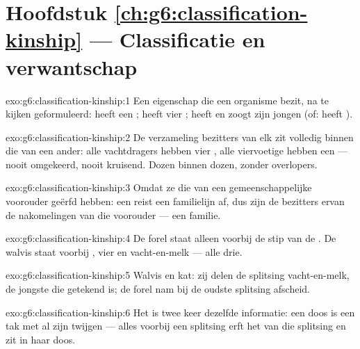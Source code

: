 \section*{Hoofdstuk \ref{ch:g6:classification-kinship} --- Classificatie en verwantschap}

\begin{solution}{exo:g6:classification-kinship:1}
Een eigenschap die een organisme bezit, na te kijken geformuleerd: heeft
een ; heeft vier ; heeft  en zoogt zijn jongen
(of: heeft ).
\end{solution}

\begin{solution}{exo:g6:classification-kinship:2}
De verzameling bezitters van elk  zit volledig binnen die van een
ander: alle vachtdragers hebben vier , alle viervoetige 
hebben een  --- nooit omgekeerd, nooit kruisend. Dozen binnen
dozen, zonder overlopers.
\end{solution}

\begin{solution}{exo:g6:classification-kinship:3}
Omdat ze die van een gemeenschappelijke voorouder geërfd hebben: een
 reist een familielijn af, dus zijn de bezitters ervan de
nakomelingen van die voorouder --- een familie.
\end{solution}

\begin{solution}{exo:g6:classification-kinship:4}
De forel staat alleen voorbij de stip van de . De walvis staat
voorbij , vier  en vacht-en-melk --- alle drie.
\end{solution}

\begin{solution}{exo:g6:classification-kinship:5}
Walvis en kat: zij delen de splitsing vacht-en-melk, de jongste die
getekend is; de forel nam bij de oudste splitsing afscheid.
\end{solution}

\begin{solution}{exo:g6:classification-kinship:6}
Het is twee keer dezelfde informatie: een doos is een tak met al zijn
twijgen --- alles voorbij een splitsing erft het  van die
splitsing en zit in haar doos.
\end{solution}

